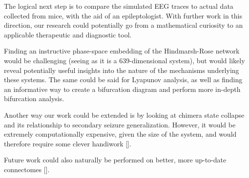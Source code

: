 The logical next step is to compare the simulated EEG traces to actual data collected from mice, with the aid of an epileptologist.
With further work in this direction, our research could potentially go from a mathematical curiosity to an applicable therapeutic and diagnostic tool.

Finding an instructive phase-space embedding of the Hindmarsh-Rose network would be challenging (seeing as it is a 639-dimensional system),
but would likely reveal potentially useful insights into the nature of the mechanisms underlying these systems.
The same could be said for Lyapunov analysis, as well as finding an informative way to create a bifurcation diagram and perform more in-depth bifurcation analysis.

Another way our work could be extended is by looking at chimera state collapse and its relationship to secondary seizure generalization.
However, it would be extremely computationally expensive, given the size of the system, and would therefore require some clever handiwork [].

Future work could also naturally be performed on better, more up-to-date connectomes [].


